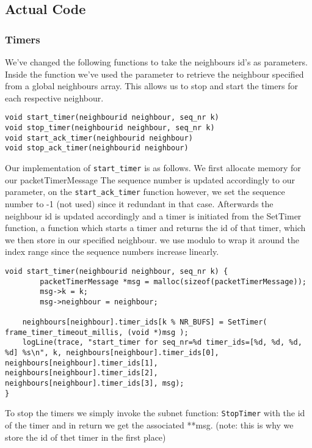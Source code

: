 \subsection{Actual Code}
\subsubsection{Timers}

We've changed the following functions to take the neighbours id's as parameters.
Inside the function we've used the parameter to retrieve the neighbour specified from a global neighbours array.
This allows us to stop and start the timers for each respective neighbour.

\begin{lstlisting}
void start_timer(neighbourid neighbour, seq_nr k)
void stop_timer(neighbourid neighbour, seq_nr k)
void start_ack_timer(neighbourid neighbour)
void stop_ack_timer(neighbourid neighbour)
\end{lstlisting}


Our implementation of \texttt{start\_timer} is as follows. We first allocate memory for our {packetTimerMessage}
The sequence number is updated accordingly to our parameter, on the \linebreak\texttt{start\_ack\_timer} function however, we set the sequence number to -1 (not used) since it redundant in that case.
Afterwards the neighbour id is updated accordingly and a timer is initiated from the SetTimer function, a function which starts a timer and returns the id of that timer,
which we then store in our specified neighbour.
we use modulo to wrap it around the index range since the sequence numbers increase linearly.
\begin{lstlisting}
void start_timer(neighbourid neighbour, seq_nr k) {
        packetTimerMessage *msg = malloc(sizeof(packetTimerMessage));
        msg->k = k;
        msg->neighbour = neighbour;

	neighbours[neighbour].timer_ids[k % NR_BUFS] = SetTimer( frame_timer_timeout_millis, (void *)msg );
	logLine(trace, "start_timer for seq_nr=%d timer_ids=[%d, %d, %d, %d] %s\n", k, neighbours[neighbour].timer_ids[0], neighbours[neighbour].timer_ids[1], neighbours[neighbour].timer_ids[2], neighbours[neighbour].timer_ids[3], msg);
}
\end{lstlisting}


To stop the timers we simply invoke the subnet function: \texttt{StopTimer} with the id of the timer
and in return we get the associated **msg. (note: this is why we store the id of thet timer in the first place)

